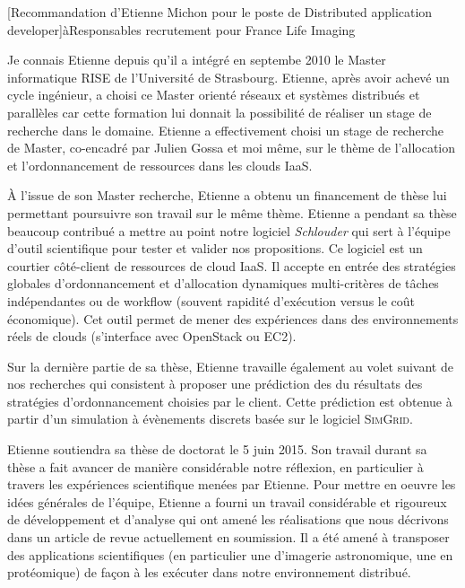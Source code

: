 \documentclass[a4paper,10pt]{article}
\begin{document}


\begin{letter}[Recommandation d'Etienne Michon pour le poste de Distributed application developer]{à}{Responsables recrutement pour France Life Imaging}

  Je  connais  Etienne  depuis  qu'il  a intégré  en  septembe  2010  le  Master
  informatique RISE de  l'Université de Strasbourg. Etienne,  après avoir achevé
  un cycle ingénieur, a choisi ce  Master orienté réseaux et systèmes distribués
  et parallèles  car cette formation lui  donnait la possibilité de  réaliser un
  stage de recherche dans le domaine. Etienne a effectivement choisi un stage de
  recherche de Master, co-encadré par Julien Gossa  et moi même, sur le thème de
  l'allocation et l'ordonnancement de ressources dans les clouds IaaS.

  À l'issue  de son Master recherche,  Etienne a obtenu un  financement de thèse
  lui permettant poursuivre son travail sur  le même thème. Etienne a pendant sa
  thèse beaucoup contribué a mettre au point notre logiciel \emph{Schlouder} qui
  sert   à  l'équipe   d'outil   scientifique  pour   tester   et  valider   nos
  propositions. Ce logiciel  est un courtier côté-client de  ressources de cloud
  IaaS.  Il  accepte  en  entrée des  stratégies  globales  d'ordonnancement  et
  d'allocation dynamiques multi-critères de  tâches indépendantes ou de workflow
  (souvent rapidité d'exécution versus le  coût économique). Cet outil permet de
  mener des  expériences dans  des environnements  réels de  clouds (s'interface
  avec OpenStack ou EC2).

  Sur  la dernière  partie de  sa thèse,  Etienne travaille  également au  volet
  suivant de  nos recherches  qui consistent  à proposer  une prédiction  des du
  résultats  des  stratégies  d'ordonnancement  choisies par  le  client.  Cette
  prédiction est  obtenue à partir  d'un simulation à évènements  discrets basée
  sur le logiciel \textsc{SimGrid}.

  Etienne soutiendra sa thèse de doctorat le  5 juin 2015. Son travail durant sa
  thèse a fait avancer de manière considérable notre réflexion, en particulier à
  travers les expériences scientifique menées par Etienne. Pour mettre en oeuvre
 les idées générales de l'équipe, Etienne a fourni un travail considérable et
 rigoureux de développement et d'analyse qui ont amené les réalisations que nous
décrivons dans un article de revue actuellement en soumission. Il a été amené à
transposer des applications scientifiques (en particulier une d'imagerie
astronomique, une en protéomique) de façon à les exécuter dans notre
environnement distribué. 


\end{letter}
\end{document}
